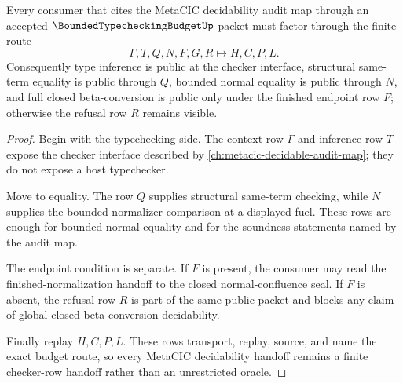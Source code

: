 \begin{theorem}
\label{thm:bounded-typechecking-budget-metacic-decidable-handoff}
Every consumer that cites the MetaCIC decidability audit map through an accepted $\BoundedTypecheckingBudgetUp$ packet must factor through the finite route
$$
\Gamma,T,Q,N,F,G,R \longmapsto H,C,P,L .
$$
Consequently type inference is public at the checker interface, structural same-term equality is public through $Q$, bounded normal equality is public through $N$, and full closed beta-conversion is public only under the finished endpoint row $F$; otherwise the refusal row $R$ remains visible.
\end{theorem}
\begin{proof}
Begin with the typechecking side. The context row $\Gamma$ and inference row $T$ expose the checker interface described by \autoref{ch:metacic-decidable-audit-map}; they do not expose a host typechecker.

Move to equality. The row $Q$ supplies structural same-term checking, while $N$ supplies the bounded normalizer comparison at a displayed fuel. These rows are enough for bounded normal equality and for the soundness statements named by the audit map.

The endpoint condition is separate. If $F$ is present, the consumer may read the finished-normalization handoff to the closed normal-confluence seal. If $F$ is absent, the refusal row $R$ is part of the same public packet and blocks any claim of global closed beta-conversion decidability.

Finally replay $H,C,P,L$. These rows transport, replay, source, and name the exact budget route, so every MetaCIC decidability handoff remains a finite checker-row handoff rather than an unrestricted oracle.
\end{proof}

